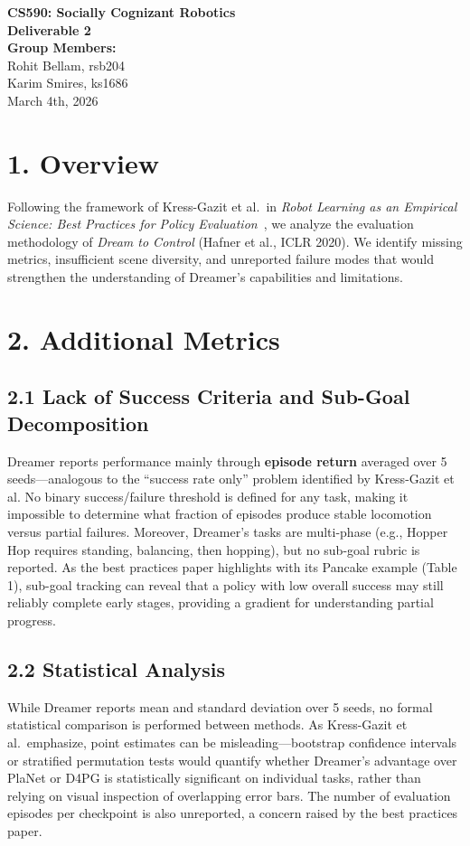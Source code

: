 \documentclass[11pt]{article}
\begin{document}
\begin{center}
  {\Large \textbf{CS590: Socially Cognizant Robotics}} \\[5pt]
  {\Large \textbf{Deliverable 2}} \\[12pt]
  \textbf{Group Members:} \\[3pt]
  Rohit Bellam, rsb204 \\
  Karim Smires, ks1686 \\[8pt]
  March 4th, 2026
\end{center}

\vspace{2pt}

\section{1. Overview}

Following the framework of Kress-Gazit et al.\ in \textit{Robot
  Learning as an Empirical Science: Best Practices for Policy
Evaluation}~\cite{bestpractices}, we analyze the evaluation
methodology of \textit{Dream to Control} (Hafner et al.,
ICLR 2020). We identify missing metrics, insufficient scene
diversity, and unreported failure modes that would strengthen the
understanding of Dreamer's capabilities and limitations.

\section{2. Additional Metrics}

\subsection{2.1 Lack of Success Criteria and Sub-Goal Decomposition}
Dreamer reports performance mainly through \textbf{episode return}
averaged over 5 seeds---analogous to the ``success rate only''
problem identified by Kress-Gazit et al. No binary
success/failure threshold is defined for any task, making it
impossible to determine what fraction of episodes produce stable
locomotion versus partial failures. Moreover, Dreamer's tasks are
multi-phase (e.g., Hopper Hop requires standing, balancing, then
hopping), but no sub-goal rubric is reported. As the best
practices paper highlights with its Pancake example (Table 1),
sub-goal tracking can reveal that a policy with low overall success
may still reliably complete early stages, providing a
gradient for understanding partial progress.

\subsection{2.2 Statistical Analysis}
While Dreamer reports mean and standard deviation over 5 seeds, no
formal statistical comparison is performed between methods. As
Kress-Gazit et al.\ emphasize, point estimates can be
misleading---bootstrap confidence intervals or stratified
permutation tests would quantify whether Dreamer's advantage over
PlaNet or D4PG is statistically significant on individual tasks,
rather than relying on visual inspection of overlapping error bars.
The number of evaluation episodes per checkpoint is also unreported,
a concern raised by the best practices paper.
\end{document}
